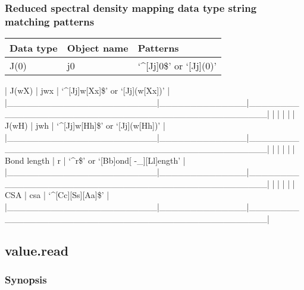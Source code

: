 \subsubsection{Reduced spectral density mapping data type string matching patterns}



\begin{center}
\begin{tabular}{lll}
\toprule
Data type & Object name & Patterns \\
\midrule
 J(0)                    &  j0            &  `\^{}[Jj]0\$' or `[Jj](0)'                            \\
\bottomrule
\end{tabular}
\end{center}

| J(wX)                  | jwx          | `\^{}[Jj]w[Xx]\$' or `[Jj](w[Xx])'                   |
|\_\_\_\_\_\_\_\_\_\_\_\_\_\_\_\_\_\_\_\_\_\_\_\_|\_\_\_\_\_\_\_\_\_\_\_\_\_\_|\_\_\_\_\_\_\_\_\_\_\_\_\_\_\_\_\_\_\_\_\_\_\_\_\_\_\_\_\_\_\_\_\_\_\_\_\_\_\_\_\_\_\_\_\_\_\_\_\_\_|
|                        |              |                                                  |
| J(wH)                  | jwh          | `\^{}[Jj]w[Hh]\$' or `[Jj](w[Hh])'                   |
|\_\_\_\_\_\_\_\_\_\_\_\_\_\_\_\_\_\_\_\_\_\_\_\_|\_\_\_\_\_\_\_\_\_\_\_\_\_\_|\_\_\_\_\_\_\_\_\_\_\_\_\_\_\_\_\_\_\_\_\_\_\_\_\_\_\_\_\_\_\_\_\_\_\_\_\_\_\_\_\_\_\_\_\_\_\_\_\_\_|
|                        |              |                                                  |
| Bond length            | r            | `\^{}r\$' or `[Bb]ond[ -\_][Ll]ength'                 |
|\_\_\_\_\_\_\_\_\_\_\_\_\_\_\_\_\_\_\_\_\_\_\_\_|\_\_\_\_\_\_\_\_\_\_\_\_\_\_|\_\_\_\_\_\_\_\_\_\_\_\_\_\_\_\_\_\_\_\_\_\_\_\_\_\_\_\_\_\_\_\_\_\_\_\_\_\_\_\_\_\_\_\_\_\_\_\_\_\_|
|                        |              |                                                  |
| CSA                    | csa          | `\^{}[Cc][Ss][Aa]\$'                                 |
|\_\_\_\_\_\_\_\_\_\_\_\_\_\_\_\_\_\_\_\_\_\_\_\_|\_\_\_\_\_\_\_\_\_\_\_\_\_\_|\_\_\_\_\_\_\_\_\_\_\_\_\_\_\_\_\_\_\_\_\_\_\_\_\_\_\_\_\_\_\_\_\_\_\_\_\_\_\_\_\_\_\_\_\_\_\_\_\_\_|


\newpage

\subsection{value.read}


\subsubsection{Synopsis}

